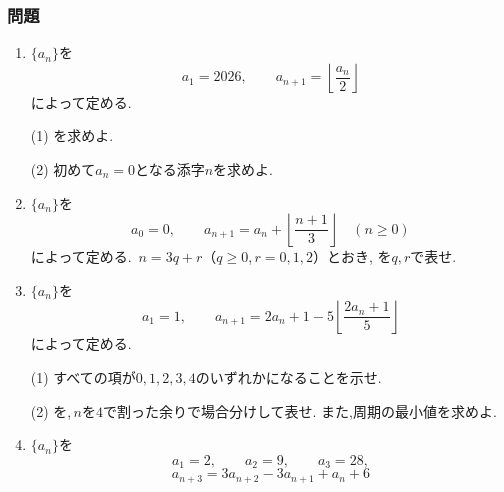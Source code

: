       \subsubsection{問題}\label{節：発展パターン・特殊性質型の演習：問題}
        \begin{enumerate}[label=\textbf{問\arabic*.},leftmargin=3.8em,format=\bookitemlink{practice-special}{problem}{answer}]
          \item {}$\displaystyle \{a_n\}$を
                \[
                  a_1=2026,\qquad
                  a_{n+1}=\left\lfloor\frac{a_n}{2}\right\rfloor
                \]
                によって定める.
                \par\smallskip\noindent
                (1) を求めよ.
                \par\smallskip\noindent
                (2) 初めて$\displaystyle a_n=0$となる添字$\displaystyle n$を求めよ.
          \item {}$\displaystyle \{a_n\}$を
                \[
                  a_0=0,\qquad
                  a_{n+1}=a_n+\left\lfloor\frac{n+1}{3}\right\rfloor
                  \quad(n\ge0)
                \]
                によって定める.\,
                $\displaystyle n=3q+r$（$\displaystyle q\ge0$,\,$\displaystyle r=0,1,2$）とおき,
                を$\displaystyle q,r$で表せ.
          \item {}$\displaystyle \{a_n\}$を
                \[
                  a_1=1,\qquad
                  a_{n+1}=2a_n+1
                    -5\left\lfloor\frac{2a_n+1}{5}\right\rfloor
                \]
                によって定める.
                \par\smallskip\noindent
                (1) すべての項が$\displaystyle 0,1,2,3,4$のいずれかになることを示せ.
                \par\smallskip\noindent
                (2) を,\,$\displaystyle n$を$\displaystyle 4$で割った余りで場合分けして表せ.
                また,周期の最小値を求めよ.
          \item {}$\displaystyle \{a_n\}$を
                \[
                  a_1=2,\qquad a_2=9,\qquad a_3=28,
                \]
                \[
                  a_{n+3}=3a_{n+2}-3a_{n+1}+a_n+6
                \]

\end{enumerate}
